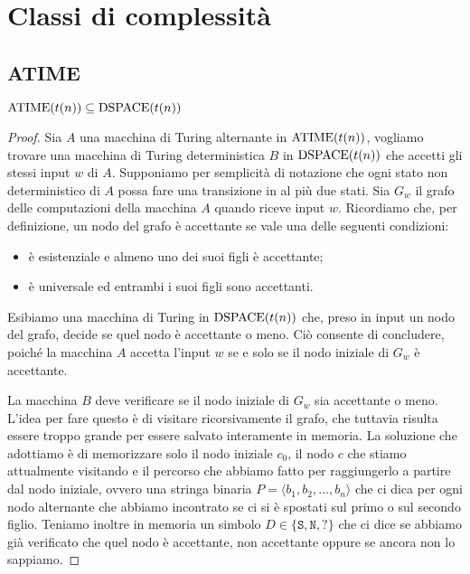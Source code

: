 \chapter{Classi di complessità}

\section{ATIME}

\begin{teorema}
 $\operatorname{ATIME}(t(n)) \subseteq \operatorname{DSPACE}(t(n))$
\end{teorema}
\begin{proof}
 Sia $A$ una macchina di Turing alternante in $\operatorname{ATIME}(t(n))$, vogliamo trovare
 una macchina di Turing deterministica $B$ in $\operatorname{DSPACE}(t(n))$ che accetti gli
 stessi input $w$ di $A$. Supponiamo per semplicità di notazione che ogni stato
 non deterministico di $A$ possa fare una transizione in al più due stati.
 Sia $G_w$ il grafo delle computazioni della macchina $A$ quando riceve input $w$.
 Ricordiamo che, per definizione, un nodo del grafo è accettante se vale una delle
 seguenti condizioni: 
 \begin{itemize}
  \item è esistenziale e almeno uno dei suoi figli è accettante;
  \item è universale ed entrambi i suoi figli sono accettanti.
 \end{itemize}
 Esibiamo una macchina di Turing in $\operatorname{DSPACE}(t(n))$ che, preso in input un nodo
 del grafo, decide se quel nodo è accettante o meno. Ciò consente di concludere, poiché
 la macchina $A$ accetta l'input $w$ se e solo se il nodo iniziale
 di $G_w$ è accettante.
 
 La macchina $B$ deve verificare se il nodo iniziale di $G_w$ sia accettante o
 meno. L'idea per fare questo è di visitare ricorsivamente il grafo, che tuttavia
 risulta essere troppo grande per essere salvato interamente in memoria. La soluzione che adottiamo
 è di memorizzare solo il nodo iniziale $c_0$, il nodo $c$ che stiamo attualmente
 visitando e il percorso che abbiamo fatto per raggiungerlo a partire dal nodo
 iniziale, ovvero una stringa binaria $P = \langle b_1, b_2, \ldots, b_n \rangle$
 che ci dica per ogni nodo alternante
 che abbiamo incontrato se ci si è spostati sul primo o sul secondo figlio.
 Teniamo inoltre in memoria un simbolo $D \in \{\texttt{S}, \texttt{N}, \texttt{?}\}$ che ci dice se
 abbiamo già verificato che quel nodo è accettante, non accettante oppure
 se ancora non lo sappiamo.
 

\end{proof}
